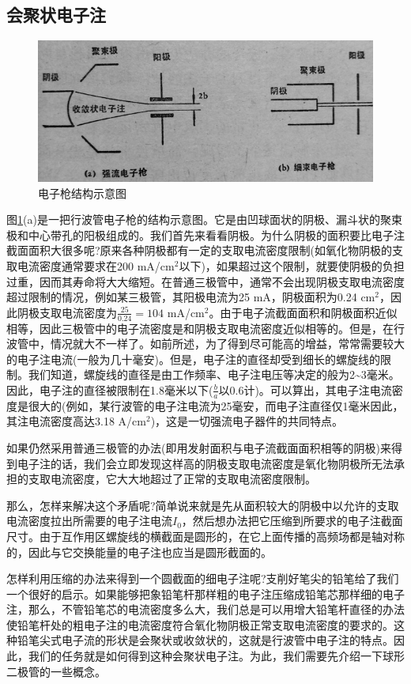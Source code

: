 \subsection{会聚状电子注}



\begin{figure}[phtb]
	\centering
	\includegraphics[width=0.65\linewidth]{figure/ch6-3}
	\caption{电子枪结构示意图}
	\label{ch6-3}
\end{figure}

图\ref{ch6-3}(a)是一把行波管电子枪的结构示意图。它是由凹球面状的阴极、漏斗状的聚束极和中心带孔的阳极组成的。我们首先来看看阴极。为什么阴极的面积要比电子注截面面积大很多呢?原来各种阴极都有一定的支取电流密度限制(如氧化物阴极的支取电流密度通常要求在200 mA/cm$ ^2 $以下)，如果超过这个限制，就要使阴极的负担过重，因而其寿命将大大缩短。在普通三极管中，通常不会出现阴极支取电流密度超过限制的情况，例如某三极管，其阳极电流为25 mA，阴极面积为0.24 cm$ ^2 $，因此阴极支取电流密度为$ \frac{25}{0.24} =104$ mA/cm$ ^2 $。由于电子流截面面积和阴极面积近似相等，因此三极管中的电子流密度是和阴极支取电流密度近似相等的。但是，在行波管中，情况就大不一样了。如前所述，为了得到尽可能高的增益，常常需要较大的电子注电流(一般为几十毫安)。但是，电子注的直径却受到细长的螺旋线的限制。我们知道，螺旋线的直径是由工作频率、电子注电压等决定的般为2\textasciitilde3毫米。因此，电子注的直径被限制在1.8毫米以下($ \frac{b}{a} $以0.6计)。可以算出，其电子注电流密度是很大的(例如，某行波管的电子注电流为25毫安，而电子注直径仅1毫米因此，其注电流密度高达3.18 A/cm$ ^2 $)，这是一切强流电子器件的共同特点。


如果仍然采用普通三极管的办法(即用发射面积与电子流截面面积相等的阴极)来得到电子注的话，我们会立即发现这样高的阴极支取电流密度是氧化物阴极所无法承担的支取电流密度，它大大地超过了正常的支取电流密度限制。

那么，怎样来解决这个矛盾呢?简单说来就是先从面积较大的阴极中以允许的支取电流密度拉出所需要的电子注电流$ I_0 $，然后想办法把它压缩到所要求的电子注截面尺寸。由于互作用区螺旋线的横截面是圆形的，在它上面传播的高频场都是轴对称的，因此与它交换能量的电子注也应当是圆形截面的。

怎样利用压缩的办法来得到一个圆截面的细电子注呢?支削好笔尖的铅笔给了我们一个很好的启示。如果能够把象铅笔杆那样粗的电子注压缩成铅笔芯那样细的电子注，那么，不管铅笔芯的电流密度多么大，我们总是可以用增大铅笔杆直径的办法使铅笔杆处的粗电子注的电流密度符合氧化物阴极正常支取电流密度的要求的。这种铅笔尖式电子流的形状是会聚状或收敛状的，这就是行波管中电子注的特点。因此，我们的任务就是如何得到这种会聚状电子注。为此，我们需要先介绍一下球形二极管的一些概念。

